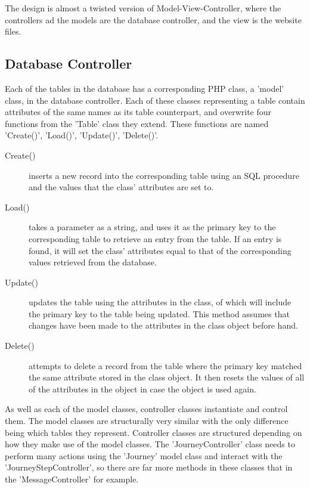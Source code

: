 \documentclass[11pt]{article}
\begin{document}
The design is almost a twisted version of Model-View-Controller, where the controllers ad the models are the database controller, and the view is the website files.

\subsection{Database Controller}
Each of the tables in the database has a corresponding PHP class, a 'model' class, in the database controller. Each of these classes representing a table contain attributes of the same names as its table counterpart, and overwrite four functions from the 'Table' class they extend. These functions are named 'Create()', 'Load()', 'Update()', 'Delete()'. 

\begin{description}
\item[Create()] inserts a new record into the corresponding table using an SQL procedure and the values that the class' attributes are set to.

\item[Load()] takes a parameter as a string, and uses it as the primary key to the corresponding table to retrieve an entry from the table. If an entry is found, it will set the class' attributes equal to that of the corresponding values retrieved from the database.

\item[Update()] updates the table using the attributes in the class, of which will include the primary key to the table being updated. This method assumes that changes have been made to the attributes in the class object before hand.

\item[Delete()] attempts to delete a record from the table where the primary key matched the same attribute stored in the class object. It then resets the values of all of the attributes in the object in case the object is used again.
 
\end{description}


As well as each of the model classes, controller classes instantiate and control them. The model classes are structurally very similar with the only difference being which tables they represent. Controller classes are structured depending on how they make use of the model classes. The 'Journey\textunderscore Controller' class needs to perform many actions using the 'Journey' model class and interact with the 'Journey\textunderscore Step\textunderscore Controller', so there are far more methods in these classes that in the 'Message\textunderscore Controller' for example.
\end{document}
